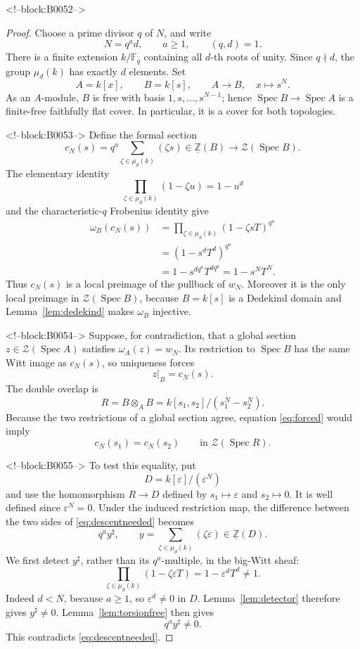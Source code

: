 \documentclass[11pt]{article}
\theoremstyle{definition}
\newcommand{\Spec}{\operatorname{Spec}}
\newcommand{\Zpre}{\underline{\mathbb Z}}
\newcommand{\Zsh}{\mathcal Z}
\newcommand{\sh}{\sharp}
\begin{document}
<!--block:B0052-->
\begin{proof}
Choose a prime divisor \(q\) of \(N\), and write
\[
 N=q^a d,\qquad a\geq1,\qquad (q,d)=1.
 \tag{4.1}\label{eq:decompose}
\]
There is a finite extension \(k/\mathbb F_q\) containing all \(d\)-th
roots of unity.  Since \(q\nmid d\), the group
\(\mu_d(k)\) has exactly \(d\) elements.  Set
\[
 A=k[x],\qquad B=k[s],\qquad A\longrightarrow B,\quad x\longmapsto s^N.
 \tag{4.2}\label{eq:rootcover}
\]
As an \(A\)-module, \(B\) is free with basis
\(1,s,\ldots,s^{N-1}\); hence \(\Spec B\to\Spec A\) is a finite-free
faithfully flat cover.  In particular, it is a cover for both topologies.

<!--block:B0053-->
Define the formal section
\[
 c_N(s)=q^a\sum_{\zeta\in\mu_d(k)}(\zeta s)
       \in\Zpre(B)\longrightarrow\Zsh(\Spec B).
 \tag{4.3}\label{eq:candidate}
\]
The elementary identity
\[
 \prod_{\zeta\in\mu_d(k)}(1-\zeta u)=1-u^d
 \tag{4.4}\label{eq:roots}
\]
and the characteristic-\(q\) Frobenius identity give
\begin{align*}
 \omega_B(c_N(s))
  &=\prod_{\zeta\in\mu_d(k)}(1-\zeta sT)^{q^a}\\
  &=(1-s^dT^d)^{q^a}\\
  &=1-s^{dq^a}T^{dq^a}
   =1-s^NT^N.
 \tag{4.5}\label{eq:localimage}
\end{align*}
Thus \(c_N(s)\) is a local preimage of the pullback of \(w_N\).
Moreover it is the only local preimage in \(\Zsh(\Spec B)\), because
\(B=k[s]\) is a Dedekind domain and Lemma~\ref{lem:dedekind} makes
\(\omega_B\) injective.

<!--block:B0054-->
Suppose, for contradiction, that a global section
\(z\in\Zsh(\Spec A)\) satisfies \(\omega_A(z)=w_N\).  Its restriction to
\(\Spec B\) has the same Witt image as \(c_N(s)\), so uniqueness forces
\[
 z|_B=c_N(s).
 \tag{4.6}\label{eq:forced}
\]
The double overlap is
\[
 R=B\otimes_A B
   =k[s_1,s_2]/(s_1^N-s_2^N).
 \tag{4.7}\label{eq:overlap}
\]
Because the two restrictions of a global section agree, equation
\eqref{eq:forced} would imply
\[
 c_N(s_1)=c_N(s_2)\qquad\text{in }\Zsh(\Spec R).
 \tag{4.8}\label{eq:descentneeded}
\]

<!--block:B0055-->
To test this equality, put
\[
 D=k[\varepsilon]/(\varepsilon^N)
 \tag{4.9}\label{eq:D}
\]
and use the homomorphism \(R\to D\) defined by
\(s_1\mapsto\varepsilon\) and \(s_2\mapsto0\).  It is well defined since
\(\varepsilon^N=0\).  Under the induced restriction map, the difference
between the two sides of \eqref{eq:descentneeded} becomes
\[
 q^a y^\sh,\qquad
 y=\sum_{\zeta\in\mu_d(k)}(\zeta\varepsilon)\in\Zpre(D).
 \tag{4.10}\label{eq:y}
\]
We first detect \(y^\sh\), rather than its \(q^a\)-multiple, in the
big-Witt sheaf:
\[
 \prod_{\zeta\in\mu_d(k)}(1-\zeta\varepsilon T)
   =1-\varepsilon^dT^d\ne1.
 \tag{4.11}\label{eq:detecty}
\]
Indeed \(d<N\), because \(a\geq1\), so
\(\varepsilon^d\ne0\) in \(D\).  Lemma~\ref{lem:detector} therefore gives
\(y^\sh\ne0\).  Lemma~\ref{lem:torsionfree} then gives
\[
 q^a y^\sh\ne0.
 \tag{4.12}\label{eq:qnonzero}
\]
This contradicts \eqref{eq:descentneeded}.


\end{proof}
\end{document}
